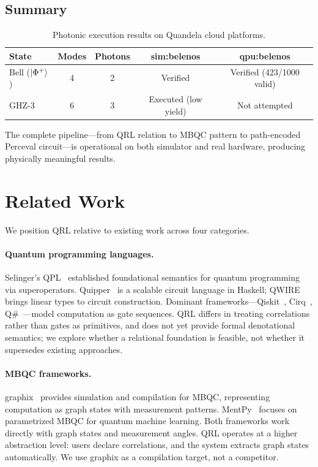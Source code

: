 \documentclass[submission,copyright,creativecommons]{eptcs}
\newcommand{\qrl}{\textsc{QRL}}
\newcommand{\mbqc}{\textsc{MBQC}}
\begin{document}
\subsection{Summary}

\begin{table}[ht]
\centering
\begin{tabular}{lcccc}
\toprule
\textbf{State} & \textbf{Modes} & \textbf{Photons} & \textbf{sim:belenos} & \textbf{qpu:belenos} \\
\midrule
Bell ($\ket{\Phi^+}$) & 4 & 2 & Verified & Verified (423/1000 valid) \\
GHZ-3 & 6 & 3 & Executed (low yield) & Not attempted \\
\bottomrule
\end{tabular}
\caption{Photonic execution results on Quandela cloud platforms.}
\label{tab:photonic}
\end{table}

The complete pipeline---from \qrl{} relation to \mbqc{} pattern to
path-encoded Perceval circuit---is operational on both simulator and
real hardware, producing physically meaningful results.


\section{Related Work}
\label{sec:related}

We position \qrl{} relative to existing work across four categories.

\paragraph{Quantum programming languages.}
Selinger's QPL~\cite{selinger2004} established foundational semantics for
quantum programming via superoperators. Quipper~\cite{quipper} is a scalable
circuit language in Haskell; QWIRE~\cite{qwire} brings linear types to
circuit construction. Dominant frameworks---Qiskit~\cite{qiskit},
Cirq~\cite{cirq}, Q\#~\cite{qsharp}---model computation as gate sequences.
\qrl{} differs in treating correlations rather than gates as primitives, and
does not yet provide formal denotational semantics; we explore whether a
relational foundation is feasible, not whether it supersedes existing approaches.

\paragraph{MBQC frameworks.}
graphix~\cite{graphix} provides simulation and compilation for \mbqc{},
representing computation as graph states with measurement patterns.
MentPy~\cite{mentpy} focuses on parametrized \mbqc{} for quantum machine learning.
Both frameworks work directly with graph states and measurement angles.
\qrl{} operates at a higher abstraction level: users declare correlations,
and the system extracts graph states automatically. We use graphix as
a compilation target, not a competitor.
\end{document}
